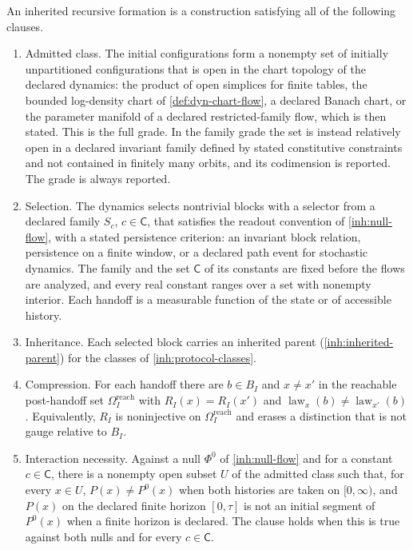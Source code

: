 An inherited recursive formation is a construction satisfying all of the
following clauses.
\begin{enumerate}
\item[(F1)] Admitted class. The initial configurations form a nonempty set of
initially unpartitioned configurations that is open in the chart topology of
the declared dynamics: the product of open simplices for finite tables, the
bounded log-density chart of \cref{def:dyn-chart-flow}, a declared Banach
chart, or the parameter manifold of a declared restricted-family flow, which
is then stated. This is the full grade. In the family grade the set is
instead relatively open in a declared invariant family defined by stated
constitutive constraints and not contained in finitely many orbits, and its
codimension is reported. The grade is always reported.
\item[(F2)] Selection. The dynamics selects nontrivial blocks with a selector
from a declared family $S_c$, $c\in\mathsf C$, that satisfies the readout
convention of \cref{inh:null-flow}, with a stated persistence criterion: an
invariant block relation, persistence on a finite window, or a declared path
event for stochastic dynamics. The family and the set $\mathsf C$ of its
constants are fixed before the flows are analyzed, and every real constant
ranges over a set with nonempty interior. Each handoff is a measurable
function of the state or of accessible history.
\item[(F3)] Inheritance. Each selected block carries an inherited parent
(\cref{inh:inherited-parent}) for the classes of \cref{inh:protocol-classes}.
\item[(F4)] Compression. For each handoff there are $b\in B_I$ and
$x\neq x'$ in the reachable post-handoff set $\Omega_I^{\mathrm{reach}}$ with
$R_I(x)=R_I(x')$ and $\operatorname{law}_x(b)\neq\operatorname{law}_{x'}(b)$.
Equivalently, $R_I$ is noninjective on $\Omega_I^{\mathrm{reach}}$ and erases
a distinction that is not gauge relative to $B_I$.
\item[(F5)] Interaction necessity. Against a null $\Phi^0$ of
\cref{inh:null-flow} and for a constant $c\in\mathsf C$, there is a nonempty
open subset $U$ of the admitted class such that, for every $x\in U$,
$P(x)\neq P^0(x)$ when both histories are taken on $[0,\infty)$, and $P(x)$
on the declared finite horizon $[0,\tau]$ is not an initial segment of
$P^0(x)$ when a finite horizon is declared. The clause holds when this is
true against both nulls and for every $c\in\mathsf C$.

\end{enumerate}
